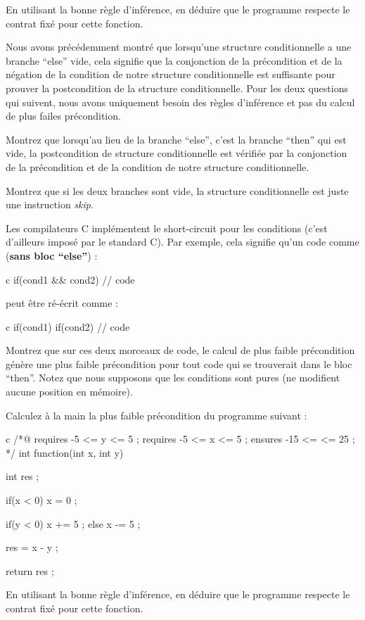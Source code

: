 En utilisant la bonne règle d'inférence, en déduire que le programme respecte le 
contrat fixé pour cette fonction.




Nous avons précédemment montré que lorsqu'une structure conditionnelle a une branche
``else'' vide, cela signifie que la conjonction de la précondition et de la négation
de la condition de notre structure conditionnelle est suffisante pour prouver la
postcondition de la structure conditionnelle.
Pour les deux questions qui suivent, nous avons uniquement besoin des règles d'inférence
et pas du calcul de plus failes précondition.


Montrez que lorsqu'au lieu de la branche ``else'', c'est la branche ``then'' qui est
vide, la postcondition de structure conditionnelle est vérifiée par la conjonction de
la précondition et de la condition de notre structure conditionnelle.


Montrez que si les deux branches sont vide, la structure conditionnelle est juste une
instruction \textit{skip}.




Les compilateurs C implémentent le short-circuit pour les conditions (c'est d'ailleurs
imposé par le standard C). Par exemple, cela signifie qu'un code comme (\textbf{sans
bloc ``else''}) :


\begin{CodeBlock}{c}
if(cond1 && cond2){
  // code
}
\end{CodeBlock}


peut être ré-écrit comme :


\begin{CodeBlock}{c}
if(cond1){
  if(cond2){    
    // code
  }
}
\end{CodeBlock}


Montrez que sur ces deux morceaux de code, le calcul de plus faible précondition
génère une plus faible précondition pour tout code qui se trouverait dans le bloc
``then''. Notez que nous supposons que les conditions sont pures (ne modifient aucune
position en mémoire).





Calculez à la main la plus faible précondition du programme suivant :


\begin{CodeBlock}{c}
/*@ 
  requires -5 <= y <= 5 ; 
  requires -5 <= x <= 5 ; 
  ensures  -15 <= \result <= 25 ;
*/
int function(int x, int y){
  int res ;

  if(x < 0){
    x = 0 ;
  }
  
  if(y < 0){
    x += 5 ;
  } else {
    x -= 5 ;
  }
  
  res = x - y ;

  return res ;
}
\end{CodeBlock}



En utilisant la bonne règle d'inférence, en déduire que le programme respecte le 
contrat fixé pour cette fonction.
